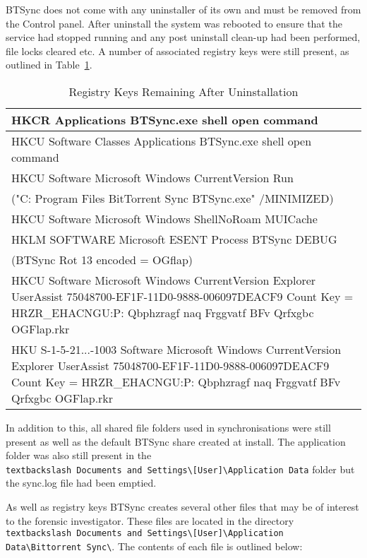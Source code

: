 \documentclass[final,5p,times,twocolumn]{elsarticle}
\begin{document}
BTSync does not come with any uninstaller of its own and must be removed from the Control panel. After uninstall the system was rebooted to ensure that the service had stopped running and any post uninstall clean-up had been performed, file locks cleared etc. A number of associated registry keys were still present, as outlined in Table~\ref{tab:regkeysafteruninstall}.

\begin{table}[h]
\begin{tabular}{|>{\raggedright\arraybackslash}p{8.5cm}|}
\hline
HKCR Applications BTSync.exe shell open command
\\ \hline
HKCU Software Classes Applications BTSync.exe shell open command
\\ \hline
HKCU Software Microsoft Windows CurrentVersion Run
\\ \hline
("C: Program Files BitTorrent Sync BTSync.exe" /MINIMIZED)
\\ \hline
HKCU Software Microsoft Windows ShellNoRoam MUICache
\\ \hline
HKLM SOFTWARE Microsoft ESENT Process BTSync DEBUG 
\\ \hline
(BTSync Rot 13 encoded = OGflap)
\\ \hline
HKCU Software Microsoft Windows CurrentVersion Explorer UserAssist {75048700-EF1F-11D0-9888-006097DEACF9} Count      Key =  HRZR\_EHACNGU:P: Qbphzragf naq Frggvatf BFv Qrfxgbc OGFlap.rkr
\\ \hline
HKU S-1-5-21...-1003 Software Microsoft Windows CurrentVersion Explorer UserAssist {75048700-EF1F-11D0-9888-006097DEACF9} Count      Key =  HRZR\_EHACNGU:P: Qbphzragf naq Frggvatf BFv Qrfxgbc OGFlap.rkr
\\ \hline
    \end{tabular}
    \caption {Registry Keys Remaining After Uninstallation}
\label{tab:regkeysafteruninstall}
\end{table}

In addition to this, all shared file folders used in synchronisations were still present as well as the default BTSync share created at install. The application folder was also still present in the \texttt{\\textbackslash Documents and Settings\textbackslash [User]\textbackslash Application Data} folder but the sync.log file had been emptied.

As well as registry keys BTSync creates several other files that may be of interest to the forensic investigator. These files are located in the directory \texttt{\\textbackslash Documents and Settings\textbackslash [User]\textbackslash Application Data\textbackslash Bittorrent Sync\textbackslash}. The contents of each file is outlined below:
\end{document}
